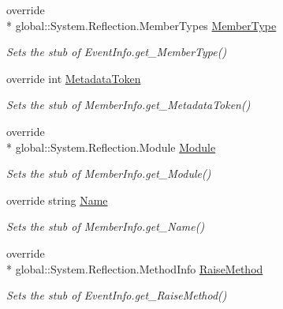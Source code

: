 \begin{DoxyCompactItemize}
override \\*
global\-::\-System.\-Reflection.\-Member\-Types \hyperlink{class_system_1_1_reflection_1_1_fakes_1_1_stub_event_info_a40daeb49bd1e7ba1447f7bcf60485e4f}{Member\-Type}
\begin{DoxyCompactList}\small\item\em Sets the stub of Event\-Info.\-get\-\_\-\-Member\-Type()\end{DoxyCompactList}\item 
override int \hyperlink{class_system_1_1_reflection_1_1_fakes_1_1_stub_event_info_a74ab710ef8a7fcb8a5a868e999e67e84}{Metadata\-Token}
\begin{DoxyCompactList}\small\item\em Sets the stub of Member\-Info.\-get\-\_\-\-Metadata\-Token()\end{DoxyCompactList}\item 
override \\*
global\-::\-System.\-Reflection.\-Module \hyperlink{class_system_1_1_reflection_1_1_fakes_1_1_stub_event_info_af1184f14eb14994d2397a26e1b40bf4f}{Module}
\begin{DoxyCompactList}\small\item\em Sets the stub of Member\-Info.\-get\-\_\-\-Module()\end{DoxyCompactList}\item 
override string \hyperlink{class_system_1_1_reflection_1_1_fakes_1_1_stub_event_info_a7bae4db326265e75449c92a270518830}{Name}
\begin{DoxyCompactList}\small\item\em Sets the stub of Member\-Info.\-get\-\_\-\-Name()\end{DoxyCompactList}\item 
override \\*
global\-::\-System.\-Reflection.\-Method\-Info \hyperlink{class_system_1_1_reflection_1_1_fakes_1_1_stub_event_info_aafa6782791af63626591dbc06f1e1ea6}{Raise\-Method}
\begin{DoxyCompactList}\small\item\em Sets the stub of Event\-Info.\-get\-\_\-\-Raise\-Method()\end{DoxyCompactList}\item 

\end{DoxyCompactItemize}
